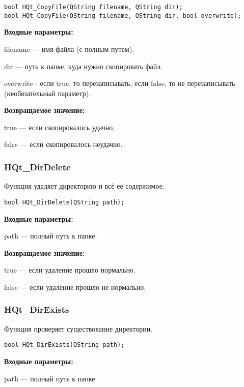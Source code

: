\documentclass[a4paper,12pt]{article}
\begin{document}
\begin{lstlisting}[label=code_syntax_HQt_CopyFile,caption=Синтаксис]
bool HQt_CopyFile(QString filename, QString dir);
bool HQt_CopyFile(QString filename, QString dir, bool overwrite);
\end{lstlisting}

\textbf{Входные параметры:}

filename --- имя файла (с полным путем),
 
dir --- путь к папке, куда нужно скопировать файл.

overwrite - если true, то перезаписывать, если false, то не перезаписывать (необязательный параметр).

\textbf{Возвращаемое значение:}

true --- если скопировалось удачно,
 
false --- если скопировалось неудачно.


\subsubsection{HQt\_DirDelete}\label{HQt_DirDelete}

Функция удаляет директорию и всё ее содержимое.


\begin{lstlisting}[label=code_syntax_HQt_DirDelete,caption=Синтаксис]
bool HQt_DirDelete(QString path);
\end{lstlisting}

\textbf{Входные параметры:}

path --- полный путь к папке.

\textbf{Возвращаемое значение:}

true --- если удаление прошло нормально.

false ---  если удаление прошло не нормально.


\subsubsection{HQt\_DirExists}\label{HQt_DirExists}

Функция проверяет существование директории.


\begin{lstlisting}[label=code_syntax_HQt_DirExists,caption=Синтаксис]
bool HQt_DirExists(QString path);
\end{lstlisting}

\textbf{Входные параметры:}

path --- полный путь к папке.
\end{document}
